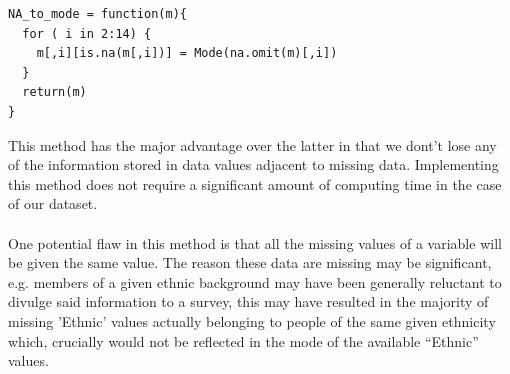 \documentclass{article}
\begin{document}
{\small
\begin{verbatim}
NA_to_mode = function(m){
  for ( i in 2:14) {
    m[,i][is.na(m[,i])] = Mode(na.omit(m)[,i])
  }
  return(m)
}
\end{verbatim}
}
This method has the major advantage over the latter in that we dont't lose any of the information stored in data values adjacent to missing data. Implementing this method does not require a significant amount of computing time in the case of our dataset.
\\\\
One potential flaw in this method is that all the missing values of a variable will be given the same value. The reason these data are missing may be significant, e.g. members of a given ethnic background may have been generally reluctant to divulge said information to a survey, this may have resulted in the majority of missing 'Ethnic' values actually belonging to people of the same given ethnicity which, crucially would not be reflected in the mode of the available “Ethnic” values.
\end{document}

